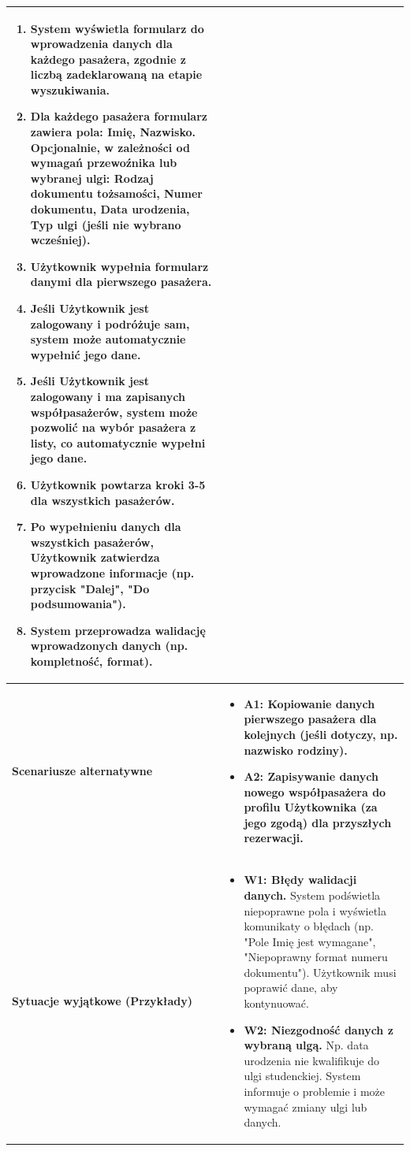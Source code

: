 \documentclass[a4paper,12pt]{article}
\begin{document}
\begin{longtable}{|p{\pierwszakolumnaszerokoscPUBKDanePas}|p{\drugakolumnaszerokoscPUBKDanePas}|}
\begin{enumerate}
            \item System wyświetla formularz do wprowadzenia danych dla każdego pasażera, zgodnie z liczbą zadeklarowaną na etapie wyszukiwania.
            \item Dla każdego pasażera formularz zawiera pola: Imię, Nazwisko. Opcjonalnie, w zależności od wymagań przewoźnika lub wybranej ulgi: Rodzaj dokumentu tożsamości, Numer dokumentu, Data urodzenia, Typ ulgi (jeśli nie wybrano wcześniej).
            \item Użytkownik wypełnia formularz danymi dla pierwszego pasażera.
            \item Jeśli Użytkownik jest zalogowany i podróżuje sam, system może automatycznie wypełnić jego dane.
            \item Jeśli Użytkownik jest zalogowany i ma zapisanych współpasażerów, system może pozwolić na wybór pasażera z listy, co automatycznie wypełni jego dane.
            \item Użytkownik powtarza kroki 3-5 dla wszystkich pasażerów.
            \item Po wypełnieniu danych dla wszystkich pasażerów, Użytkownik zatwierdza wprowadzone informacje (np. przycisk "Dalej", "Do podsumowania").
            \item System przeprowadza walidację wprowadzonych danych (np. kompletność, format).
        \end{enumerate} \\
    \hline
    \textbf{Scenariusze alternatywne} &
        \begin{itemize} \itemsep0pt \parskip0pt \parsep0pt
            \item \textbf{A1: Kopiowanie danych pierwszego pasażera dla kolejnych (jeśli dotyczy, np. nazwisko rodziny).}
            \item \textbf{A2: Zapisywanie danych nowego współpasażera do profilu Użytkownika (za jego zgodą) dla przyszłych rezerwacji.}
        \end{itemize} \\
    \hline
    \textbf{Sytuacje wyjątkowe (Przykłady)} &
        \begin{itemize} \itemsep0pt \parskip0pt \parsep0pt
            \item \textbf{W1: Błędy walidacji danych.} System podświetla niepoprawne pola i wyświetla komunikaty o błędach (np. "Pole Imię jest wymagane", "Niepoprawny format numeru dokumentu"). Użytkownik musi poprawić dane, aby kontynuować.
            \item \textbf{W2: Niezgodność danych z wybraną ulgą.} Np. data urodzenia nie kwalifikuje do ulgi studenckiej. System informuje o problemie i może wymagać zmiany ulgi lub danych.
        \end{itemize} \\
\end{longtable}
\endgroup
\end{document}

